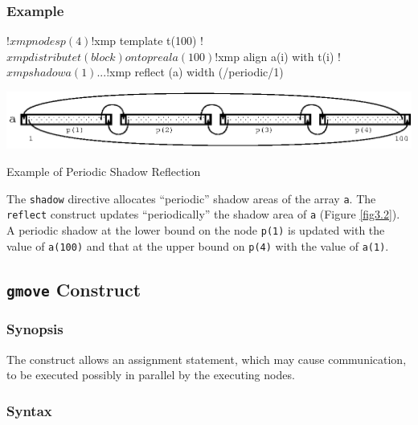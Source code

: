 \subsubsection*{Example}

\begin{XFexample}
!$xmp nodes p(4)
!$xmp template t(100)
!$xmp distribute t(block) onto p

      real a(100)
!$xmp align a(i) with t(i)
!$xmp shadow a(1)

      ...
!$xmp reflect (a) width (/periodic/1)
\end{XFexample}

\begin{myfigure}
\begin{center}
\includegraphics[width=0.9\hsize]{figs/fig3.2.eps}
\end{center}
\caption{Example of Periodic Shadow Reflection}
\label{fig3.2}
\end{myfigure}

The {\tt shadow} directive allocates ``periodic'' shadow areas of the
array {\tt a}.
The {\tt reflect} construct updates ``periodically'' the shadow area of
{\tt a} (Figure \ref{fig3.2}). A periodic shadow at the lower
bound on the node {\tt p(1)} is updated with the value of {\tt a(100)}
and that at the upper bound on {\tt p(4)} with the value of {\tt a(1)}.


\subsection{{\tt gmove} Construct}

\subsubsection*{Synopsis}


The {\tt {}} construct allows an assignment statement,
which may cause communication, to be executed possibly in parallel by
the executing nodes.

\subsubsection*{Syntax}

